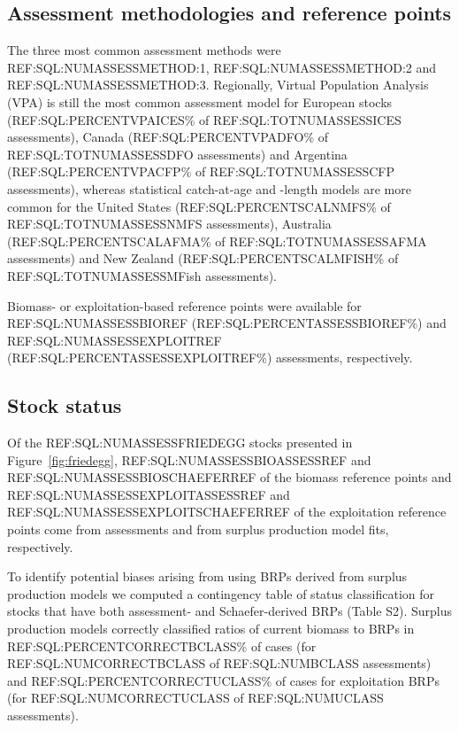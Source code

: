 \subsection*{Assessment methodologies and reference points}
\noindent
The three most common assessment methods were
REF:SQL:NUMASSESSMETHOD:1, REF:SQL:NUMASSESSMETHOD:2 and
REF:SQL:NUMASSESSMETHOD:3. Regionally, Virtual Population Analysis
(VPA) is still the most common assessment model for European stocks
(REF:SQL:PERCENTVPAICES\% of REF:SQL:TOTNUMASSESSICES assessments),
Canada (REF:SQL:PERCENTVPADFO\% of REF:SQL:TOTNUMASSESSDFO
assessments) and Argentina (REF:SQL:PERCENTVPACFP\% of
REF:SQL:TOTNUMASSESSCFP assessments), whereas statistical catch-at-age
and -length models are more common for the United States
(REF:SQL:PERCENTSCALNMFS\% of REF:SQL:TOTNUMASSESSNMFS assessments),
Australia (REF:SQL:PERCENTSCALAFMA\% of REF:SQL:TOTNUMASSESSAFMA
assessments) and New Zealand (REF:SQL:PERCENTSCALMFISH\% of
REF:SQL:TOTNUMASSESSMFish assessments).

Biomass- or exploitation-based reference points were available for
REF:SQL:NUMASSESSBIOREF (REF:SQL:PERCENTASSESSBIOREF\%) and
REF:SQL:NUMASSESSEXPLOITREF (REF:SQL:PERCENTASSESSEXPLOITREF\%)
assessments, respectively.

\subsection*{Stock status}
\noindent
Of the
REF:SQL:NUMASSESSFRIEDEGG stocks presented in
Figure~\ref{fig:friedegg}, REF:SQL:NUMASSESSBIOASSESSREF and
REF:SQL:NUMASSESSBIOSCHAEFERREF of the biomass reference points and
REF:SQL:NUMASSESSEXPLOITASSESSREF and
REF:SQL:NUMASSESSEXPLOITSCHAEFERREF of the exploitation reference
points come from assessments and from surplus production model fits,
respectively.

To identify potential biases arising from using BRPs
derived from surplus production models we computed a contingency table
of status classification for stocks that have both assessment- and
Schaefer-derived BRPs (Table S2). Surplus production models correctly
classified ratios of current biomass to BRPs in
REF:SQL:PERCENTCORRECTBCLASS\% of cases (for REF:SQL:NUMCORRECTBCLASS
of REF:SQL:NUMBCLASS assessments) and REF:SQL:PERCENTCORRECTUCLASS\%
of cases for exploitation BRPs (for REF:SQL:NUMCORRECTUCLASS of
REF:SQL:NUMUCLASS assessments).

